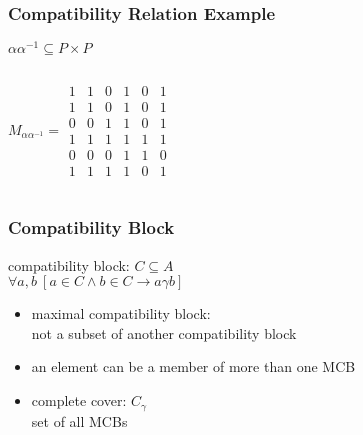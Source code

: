 \documentclass[dvipsnames]{beamer}
\begin{document}
\begin{frame}
  \frametitle{Compatibility Relation Example}

  \begin{example}
    $\alpha \alpha^{-1} \subseteq P \times P$

    \begin{columns}
      \[
        M_{\alpha \alpha^{-1}} =
          \begin{array}{|cccccc|}
            1  &  1  &  0  &  1  &  0  &  1\\
            1  &  1  &  0  &  1  &  0  &  1\\
            0  &  0  &  1  &  1  &  0  &  1\\
            1  &  1  &  1  &  1  &  1  &  1\\
            0  &  0  &  0  &  1  &  1  &  0\\
            1  &  1  &  1  &  1  &  0  &  1
          \end{array}
      \]

      \begin{center}
      \end{center}
    \end{columns}
  \end{example}
\end{frame}

\begin{frame}
  \frametitle{Compatibility Block}

  \begin{definition}
    \alert{compatibility block}: $C \subseteq A$\\
      $\forall a,b~[a \in C \wedge b \in C \rightarrow a \gamma b]$
  \end{definition}

  \pause
  \medskip
  \begin{itemize}
    \item \alert{maximal compatibility block}:\\
      not a subset of another compatibility block
    \item an element can be a member of more than one MCB

    \pause
    \medskip
    \item \alert{complete cover}: $C_\gamma$\\
      set of all MCBs
  \end{itemize}
\end{frame}
\end{document}
